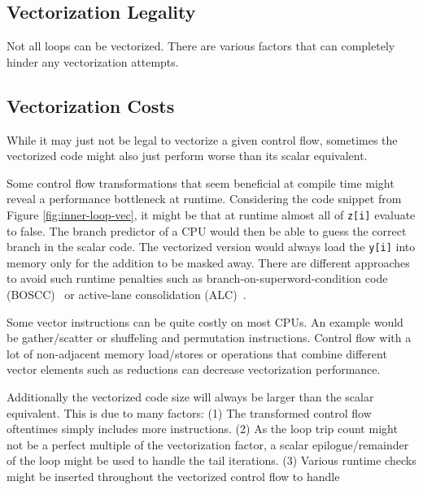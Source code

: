 \documentclass[sigplan,11pt,nonacm]{acmart}
\begin{document}
\subsection{Vectorization Legality}
Not all loops can be vectorized. There are various factors that can completely hinder any
vectorization attempts.


\subsection{Vectorization Costs}
While it may just not be legal to vectorize a given control flow, sometimes the vectorized code 
might also just perform worse than its scalar equivalent.

Some control flow transformations that seem beneficial at compile time might reveal a performance
bottleneck at runtime. Considering the code snippet from Figure \ref{fig:inner-loop-vec}, it might
be that at runtime almost all of \texttt{z[i]} evaluate to false. The branch predictor of a CPU
would then be able to guess the correct branch in the scalar code. The vectorized version would
always load the \texttt{y[i]} into memory only for the addition to be masked away. There are
different approaches to avoid such runtime penalties such as branch-on-superword-condition code 
(BOSCC)~\cite{10.5555/1299042.1299055,llvmboscc} or active-lane 
consolidation (ALC)~\cite{10.1007/s11227-022-04359-w,10.5555/3615924.3615932}.

Some vector instructions can be quite costly on most CPUs. An example would be gather/scatter
or shuffeling and permutation instructions. Control flow with a lot of non-adjacent 
memory load/stores or operations that combine different vector elements such as reductions
can decrease vectorization performance.

Additionally the vectorized code size will always be larger than the scalar equivalent. This is
due to many factors: (1) The transformed control flow oftentimes simply includes more instructions.
(2) As the loop trip count might not be a perfect multiple of the vectorization factor, a scalar
epilogue/remainder of the loop might be used to handle the tail iterations. (3) Various runtime
checks might be inserted throughout the vectorized control flow to handle %



\end{document}
